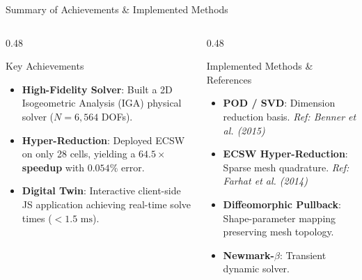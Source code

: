 
\begin{frame}{Summary of Achievements \& Implemented Methods}
  \small
  \begin{columns}[T]
    \begin{column}{0.48\textwidth}
      \begin{block}{Key Achievements}
        \footnotesize
        \begin{itemize}
          \setlength{\itemsep}{3pt}
          \item \textbf{High-Fidelity Solver}: Built a 2D Isogeometric Analysis (IGA) physical solver ($N=6{,}564$ DOFs).
          \item \textbf{Hyper-Reduction}: Deployed ECSW on only 28 cells, yielding a \textbf{$64.5\times$ speedup} with $0.054\%$ error.
          \item \textbf{Digital Twin}: Interactive client-side JS application achieving real-time solve times ($< 1.5\text{ ms}$).
        \end{itemize}
      \end{block}
    \end{column}

    \begin{column}{0.48\textwidth}
      \begin{block}{Implemented Methods \& References}
        \footnotesize
        \begin{itemize}
          \setlength{\itemsep}{2pt}
          \item \textbf{POD / SVD}: Dimension reduction basis.
          \newline \textit{Ref: Benner et al. (2015)}
          \item \textbf{ECSW Hyper-Reduction}: Sparse mesh quadrature. \textit{Ref: Farhat et al. (2014)}
          \item \textbf{Diffeomorphic Pullback}: Shape-parameter mapping preserving mesh topology.
          \item \textbf{Newmark-$\beta$}: Transient dynamic solver.
        \end{itemize}
      \end{block}
    \end{column}
  \end{columns}
\end{frame}

